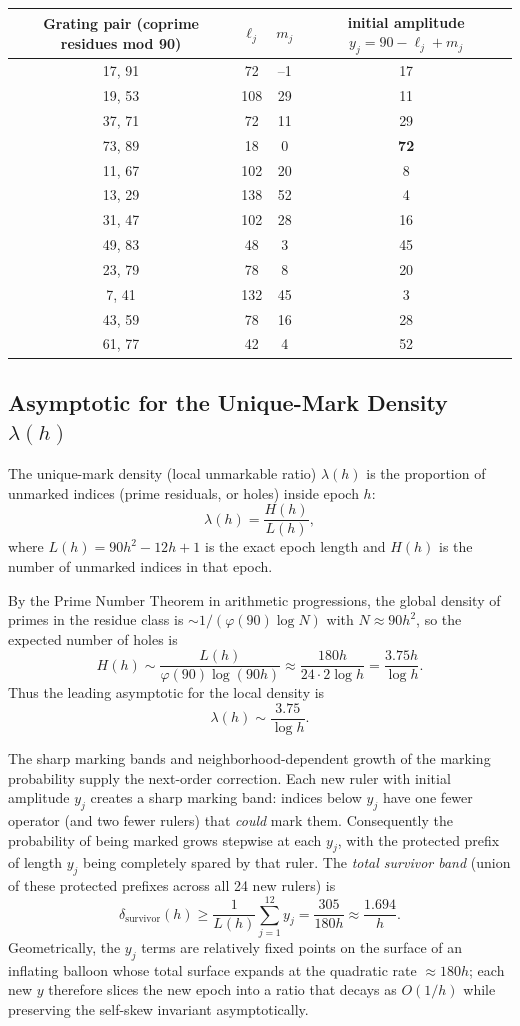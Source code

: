 \documentclass[11pt,a4paper]{article}
\begin{document}
\begin{center}
\begin{tabular}{c|cc|c}
Grating pair (coprime residues mod 90) & \(\ell_j\) & \(m_j\) & initial amplitude \(y_j = 90 - \ell_j + m_j\) \\
\hline
17, 91 & 72 & --1 & 17 \\
19, 53 & 108 & 29 & 11 \\
37, 71 & 72 & 11 & 29 \\
73, 89 & 18 & 0 & \textbf{72} \\
11, 67 & 102 & 20 & 8 \\
13, 29 & 138 & 52 & 4 \\
31, 47 & 102 & 28 & 16 \\
49, 83 & 48 & 3 & 45 \\
23, 79 & 78 & 8 & 20 \\
7, 41 & 132 & 45 & 3 \\
43, 59 & 78 & 16 & 28 \\
61, 77 & 42 & 4 & 52
\end{tabular}
\end{center}


\subsection{Asymptotic for the Unique-Mark Density \(\lambda(h)\)}

The unique-mark density (local unmarkable ratio) \(\lambda(h)\) is the proportion of unmarked indices (prime residuals, or holes) inside epoch \(h\):
\[
\lambda(h) = \frac{H(h)}{L(h)},
\]
where \(L(h) = 90h^2 - 12h + 1\) is the exact epoch length and \(H(h)\) is the number of unmarked indices in that epoch.

By the Prime Number Theorem in arithmetic progressions, the global density of primes in the residue class is \(\sim 1/(\varphi(90)\log N)\) with \(N\approx 90h^2\), so the expected number of holes is
\[
H(h)\sim \frac{L(h)}{\varphi(90)\log(90h)}\approx\frac{180h}{24\cdot 2\log h}=\frac{3.75 h}{\log h}.
\]
Thus the leading asymptotic for the local density is
\[
\lambda(h)\sim\frac{3.75}{\log h}.
\]

The sharp marking bands and neighborhood-dependent growth of the marking probability supply the next-order correction. Each new ruler with initial amplitude \(y_j\) creates a sharp marking band: indices below \(y_j\) have one fewer operator (and two fewer rulers) that \emph{could} mark them. Consequently the probability of being marked grows stepwise at each \(y_j\), with the protected prefix of length \(y_j\) being completely spared by that ruler. The \emph{total survivor band} (union of these protected prefixes across all 24 new rulers) is
\[
\delta_{\text{survivor}}(h)\ge\frac{1}{L(h)}\sum_{j=1}^{12} y_j=\frac{305}{180h}\approx\frac{1.694}{h}.
\]
Geometrically, the \(y_j\) terms are relatively fixed points on the surface of an inflating balloon whose total surface expands at the quadratic rate \(\approx180h\); each new \(y\) therefore slices the new epoch into a ratio that decays as \(O(1/h)\) while preserving the self-skew invariant asymptotically.
\end{document}
